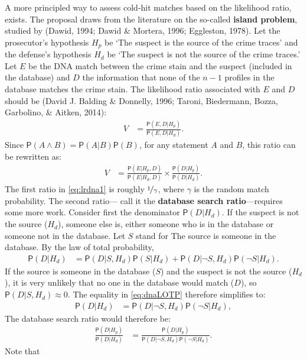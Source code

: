 \documentclass[
  10pt,
  dvipsnames,enabledeprecatedfontcommands]{scrartcl}
\newcommand{\pr}[1]{\mathsf{P}(#1)}
\begin{document}
A more principled way to assess cold-hit matches based on the likelihood
ratio, exists. The proposal draws from the literature on the so-called
\textbf{island problem}, studied by (Dawid, 1994; Dawid \& Mortera,
1996; Eggleston, 1978). Let the prosecutor's hypothesis \(H_p\) be `The
suspect is the source of the crime traces' and the defense's hypothesis
\(H_d\) be `The suspect is not the source of the crime traces.' Let
\(E\) be the DNA match between the crime stain and the suspect (included
in the database) and \(D\) the information that none of the \(n-1\)
profiles in the database matches the crime stain. The likelihood ratio
associated with \(E\) and \(D\) should be (David J. Balding \& Donnelly,
1996; Taroni, Biedermann, Bozza, Garbolino, \& Aitken, 2014):
\begin{align*}
V & = \frac{\pr{E,D\vert H_p}}{\pr{E,D\vert H_d}}.
\end{align*} Since \(\pr{A\wedge B}=\pr{A\vert B}\pr{B}\), for any
statement \(A\) and \(B\), this ratio can be rewritten as:
\begin{align}\label{eq:lrdna1}
V & = \frac{\pr{E\vert H_p,D}}{\pr{E\vert H_d,D}} \times \frac{\pr{D\vert H_p}}{\pr{D\vert H_d}}.
\end{align} \noindent The first ratio in \eqref{eq:lrdna1} is roughly
\(\nicefrac{1}{\gamma}\), where \(\gamma\) is the random match
probability. The second ratio--- call it the
\textbf{database search ratio}---requires some more work. Consider first
the denominator \(\pr{D \vert H_d}\). If the suspect is not the source
(\(H_d\)), someone else is, either someone who is in the database or
someone not in the database. Let \(S\) stand for
\textsf{The  source is someone in the database.} By the law of total
probability, \begin{align}\label{eq:dnaLOTP}
\pr{D\vert H_d} & = \pr{D\vert S, H_d} \pr{S\vert H_d} + \pr{D\vert \neg S, H_d} \pr{\neg S \vert H_d}. 
\end{align} If the source is someone in the database (\(S\)) and the
suspect is not the source (\(H_d\)), it is very unlikely that no one in
the database would match (\(D\)), so \(\pr{D\vert S, H_d}\approx 0\).
The equality in \eqref{eq:dnaLOTP} therefore simplifies to:
\vspace{-4mm} \begin{align*}
\pr{D\vert H_d} & =  \pr{D\vert \neg S, H_d} \pr{\neg S \vert H_d}, 
\end{align*} \noindent The database search ratio would therefore be:
\begin{align*}
\frac{\pr{D\vert H_p}}{\pr{D\vert H_d}} & = \frac{\pr{D\vert H_p}}{\pr{D\vert \neg S, H_d} \pr{\neg S \vert H_d}}.
\end{align*} \noindent Note that
\end{document}
